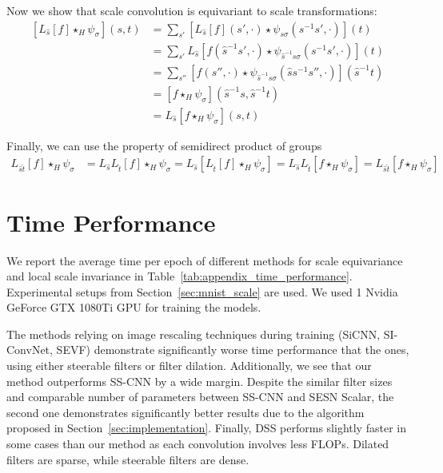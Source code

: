 \documentclass{article} \usepackage{multirow}
\def\Tabref#1{Table~\ref{#1}}
\def\Secref#1{Section~\ref{#1}}
\begin{document}
Now we show that scale convolution is equivariant to scale transformations:
\begin{equation}
    \label{eq:appendix_equivariance_proof_2}
    \begin{split}
        [L_{\hat{s}}[f] \star_H \psi_\sigma](s, t)
        &= \sum_{s'}  [L_{\hat{s}}[f] (s', \cdot) \star \psi_{s\sigma}(s^{-1}s', \cdot)](t) \\
        &= \sum_{s'}  L_{\hat{s}}[f (\hat{s}^{-1}s', \cdot) \star \psi_{\hat{s}^{-1}s\sigma}(s^{-1}s', \cdot)](t) \\
        &= \sum_{s''}[f (s'', \cdot) \star \psi_{\hat{s}^{-1}s\sigma}(\hat{s}s^{-1}s'', \cdot)](\hat{s}^{-1}t) \\
        &= [f \star_H \psi_\sigma](\hat{s}^{-1}s, \hat{s}^{-1}t) \\
        &= L_{\hat{s}}[f \star_H \psi_\sigma](s, t)
    \end{split}
\end{equation}

Finally, we can use the property of semidirect product of groups
\begin{equation}
    \label{eq:appendix_equivariance_proof_3}
    \begin{split}
        L_{\hat{s}\hat{t}}[f] \star_H \psi_\sigma
        &= L_{\hat{s}}L_{\hat{t}}[f] \star_H \psi_\sigma
        = L_{\hat{s}}[L_{\hat{t}}[f] \star_H \psi_\sigma]
        = L_{\hat{s}}L_{\hat{t}}[f \star_H \psi_\sigma]
        = L_{\hat{s}\hat{t}}[f \star_H \psi_\sigma]
    \end{split}
\end{equation}

\newpage 
\section{Time Performance}
\label{sec:appendix_time}
We report the average time per epoch of different methods for scale equivariance
and local scale invariance in \Tabref{tab:appendix_time_performance}. 
Experimental setups from \Secref{sec:mnist_scale} are used. 
We used 1 Nvidia GeForce GTX 1080Ti GPU for training the models.

The methods relying on image rescaling techniques during training 
(SiCNN, SI-ConvNet, SEVF) demonstrate significantly worse time performance that 
the ones, using either steerable filters or filter dilation. Additionally, we see 
that our method outperforms SS-CNN by a wide margin. Despite the similar 
filter sizes and comparable number of parameters between SS-CNN and SESN Scalar, the 
second one demonstrates significantly better results due to the algorithm proposed in \Secref{sec:implementation}.
Finally, DSS performs slightly faster in some cases than our method as each convolution involves less FLOPs. Dilated filters 
are sparse, while steerable filters are dense. 
\end{document}
